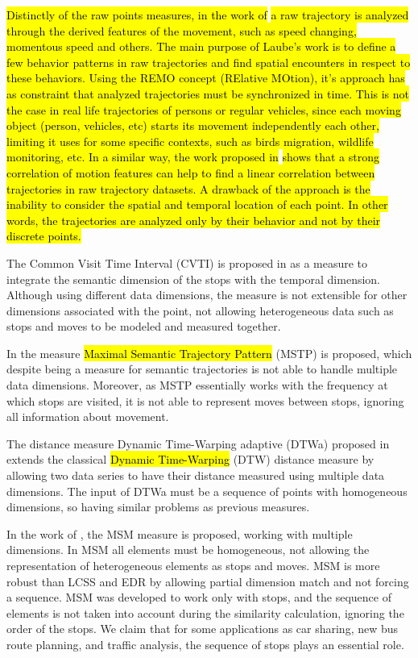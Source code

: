 \documentclass[12pt]{article}
\begin{document}
\hl{Distinctly of the raw points measures, in the work of }\cite{Laube2005}\hl{ a raw trajectory is analyzed through the derived features of the movement, such as speed changing, momentous speed and others. The main purpose of Laube's work is to define a few behavior patterns in raw trajectories and find spatial encounters in respect to these behaviors. Using the REMO concept (RElative MOtion), it's approach has as constraint that analyzed trajectories must be synchronized in time. This is not the case in real life trajectories of persons or regular vehicles, since each moving object (person, vehicles, etc) starts its movement independently each other, limiting it uses for some specific contexts, such as birds migration, wildlife monitoring, etc. In a similar way, the work proposed in } \cite{Shirabe2006}\hl{ shows that a strong correlation of motion features can help to find a linear correlation between trajectories in raw trajectory datasets. A drawback of the approach is the inability to consider the spatial and temporal location of each point. In other words, the trajectories are analyzed only by their behavior and not by their discrete points.}

The Common Visit Time Interval (CVTI) is proposed in \cite{Kang:2009:SMT:1529282.1529580} as a measure to integrate the semantic dimension of the stops with the temporal dimension. Although using different data dimensions, the measure is not extensible for other dimensions associated with the point, not allowing heterogeneous data such as stops and moves to be modeled and measured together.

In \cite{Ying:2010:MUS:1867699.1867703} the measure \hl{Maximal Semantic Trajectory Pattern} (MSTP) is proposed, which despite being a measure for semantic trajectories is not able to handle multiple data dimensions. Moreover, as MSTP essentially works with the frequency at which stops are visited, it is not able to represent moves between stops, ignoring all information about movement.

The distance measure Dynamic Time-Warping adaptive (DTWa) proposed in \cite{Shokoohi-Yekta2017} extends the classical \hl{Dynamic Time-Warping} (DTW) \cite{berndt1994using} distance measure by allowing two data series to have their distance measured using multiple data dimensions. The input of DTWa must be a sequence of points with homogeneous dimensions, so having similar problems as previous measures.

In the work of \cite{Furtado:TGIS12156}, the MSM measure is proposed, working with multiple dimensions. In MSM all elements must be homogeneous, not allowing the representation of heterogeneous elements as stops and moves. MSM is more robust than LCSS and EDR by allowing partial dimension match and not forcing a sequence. MSM was developed to work only with stops, and the sequence of elements is not taken into account during the similarity calculation, ignoring the order of the stops. We claim that for some applications as car sharing, new bus route planning, and traffic analysis, the sequence of stops plays an essential role.
\end{document}
